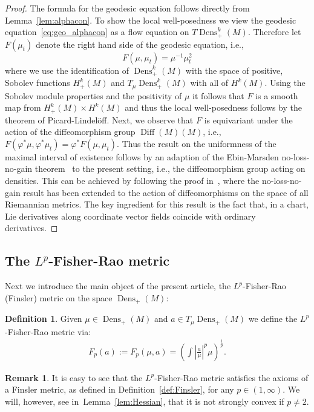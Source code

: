 \documentclass[11pt]{amsart}
\theoremstyle{definition}
\newtheorem{definition}[theorem]{Definition}
\newtheorem{remark}[theorem]{Remark}
\newcommand{\Abs}[1]{\left|#1\right|}
\newcommand{\dx}{\lambda}
\newcommand{\Prob}{\operatorname{Prob}(M)}
\newcommand{\Dens}{\operatorname{Dens}_+(M)}
\newcommand{\Densk}{\operatorname{Dens}^k_+(M)}
\newcommand{\Diff}{\operatorname{Diff}(M)}
\begin{document}
\begin{proof}
The formula for the geodesic equation follows directly from Lemma~\ref{lem:alphacon}. To show the local well-posedness we view the geodesic equation~\eqref{eq:geo_alphacon} as a flow equation on $T\Densk$. Therefore let $F(\mu_t)$ denote the right hand side of the geodesic equation, i.e., 
\begin{equation}
F(\mu,\mu_t)=\mu^{-1}\mu_t^2
\end{equation}
where we use the identification of $\Densk$ with the space of positive, Sobolev functions $H^k_+(M)$ and $T_{\mu}\Densk$ with all of $H^k(M)$. Using the Sobolev  module properties and the positivity of $\mu$ it follows that $F$ is a smooth map from $H^k_+(M)\times H^k(M)$ and thus the local well-posedness follows by the theorem of Picard-Lindel\"off. Next, we observe that $F$ is equivariant under the action of the diffeomorphism group $\Diff(M)$, i.e., $F(\varphi^* \mu,\varphi^* \mu_t)=\varphi^*F( \mu,\mu_t)$. Thus the result on the uniformness of the maximal interval of existence follows by an adaption of the Ebin-Marsden no-loss-no-gain theorem~\cite[Lemma 12.2]{ebin1970groups} to the present setting, i.e., the diffeomorphism group acting on densities. This can be achieved by following the proof in~\cite{bauer2022smooth}, where the no-loss-no-gain result has been extended to the action of  diffeomorphisms on the space of all Riemannian metrics. The
key ingredient for this result is the fact that, in a chart, Lie derivatives along coordinate vector fields coincide with ordinary derivatives. 
\end{proof}


\subsection{The $L^p$-Fisher-Rao metric}
Next we introduce the main object of the present article, the $L^p$-Fisher-Rao (Finsler) metric on the space $\Dens$:
\begin{definition}
Given $\mu\in \Dens$ and $a\in T_\mu\Dens$ we define the $L^p$-Fisher-Rao metric via:
\begin{align}\label{lp-fisher-rao}
F_p(a):=F_p({\mu},a)=\left(\int\Abs{\frac{a}{\mu}}^p\mu\right)^{\frac{1}{p}}.
\end{align}
\end{definition}
\begin{remark}
It is easy to see that the $L^p$-Fisher-Rao metric satisfies the axioms of a Finsler metric, as defined in Definition~\ref{def:Finsler}, for any $p\in(1,\infty)$. We will, however, see in~Lemma~\ref{lem:Hessian}, that it is not strongly convex if $p\neq 2$. 
\end{remark}
\end{document}
